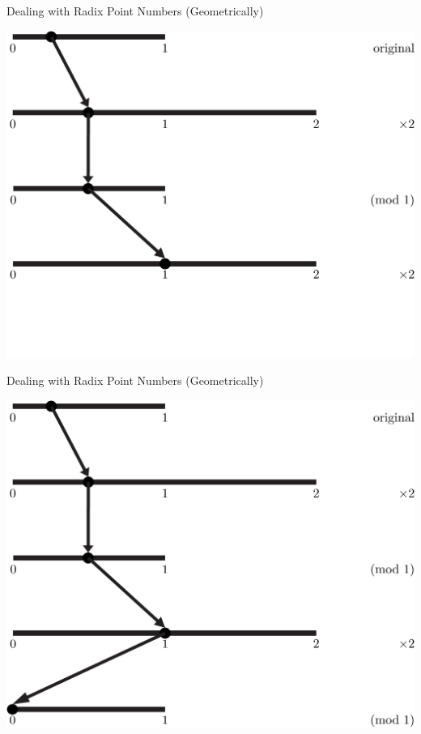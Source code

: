 \documentclass{beamer}
\begin{document}
\begin{frame}{Dealing with Radix Point Numbers (Geometrically)}
  \begin{example}
    \includegraphics[width=\textwidth,height=0.75\textheight]{images/Binary/4}
  \end{example}
\end{frame}

\begin{frame}{Dealing with Radix Point Numbers (Geometrically)}
  \begin{example}
    \includegraphics[width=\textwidth,height=0.75\textheight]{images/Binary/5}
  \end{example}
\end{frame}
\end{document}
